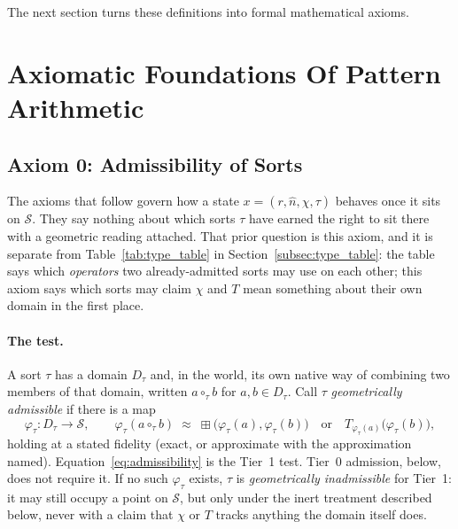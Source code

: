 \documentclass[12pt, a4paper]{article}
\begin{document}
The next section turns these definitions into formal mathematical axioms.


\section{Axiomatic Foundations Of Pattern Arithmetic}

\subsection{Axiom 0: Admissibility of Sorts}
\label{subsec:axiom0_admissibility}
The axioms that follow govern how a state $x=(r,\hat n,\chi,\tau)$
behaves once it sits on $\mathcal{S}$. They say nothing about which
sorts $\tau$ have earned the right to sit there with a geometric
reading attached. That prior question is this axiom, and it is
separate from Table~\ref{tab:type_table} in
Section~\ref{subsec:type_table}: the table says which
\emph{operators} two already-admitted sorts may use on each other;
this axiom says which sorts may claim $\chi$ and $T$ mean something
about their own domain in the first place.

\paragraph{The test.} A sort $\tau$ has a domain $D_\tau$ and, in the
world, its own native way of combining two members of that domain,
written $a \circ_\tau b$ for $a,b \in D_\tau$. Call $\tau$
\emph{geometrically admissible} if there is a map
\begin{equation}
    \varphi_\tau : D_\tau \longrightarrow \mathcal{S}, \qquad
    \varphi_\tau(a \circ_\tau b) \;\approx\;
    \boxplus\bigl(\varphi_\tau(a), \varphi_\tau(b)\bigr)
    \quad \text{or} \quad
    T_{\varphi_\tau(a)}\bigl(\varphi_\tau(b)\bigr),
    \label{eq:admissibility}
\end{equation}
holding at a stated fidelity (exact, or approximate with the
approximation named). Equation~\eqref{eq:admissibility} is the
Tier~1 test. Tier~0 admission, below, does not require it.
If no such $\varphi_\tau$ exists, $\tau$ is
\emph{geometrically inadmissible} for Tier~1: it may still occupy a point on
$\mathcal{S}$, but only under the inert treatment described below,
never with a claim that $\chi$ or $T$ tracks anything the domain
itself does.
\end{document}
